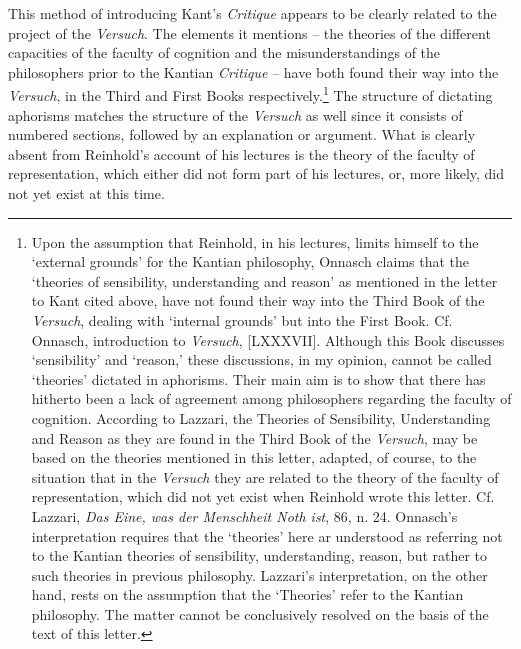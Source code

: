 This method of introducing Kant's \textit{Critique} appears to be clearly related to the project of the \textit{Versuch}. The elements it mentions {--} the theories of the different capacities of the faculty of cognition and the misunderstandings of the philosophers prior to the Kantian \textit{Critique} {--} have both found their way into the \textit{Versuch}, in the Third and First Books respectively.\footnote{ Upon the assumption that Reinhold, in his lectures, limits himself to the `external grounds' for the Kantian philosophy, Onnasch claims that the `theories of sensibility, understanding and reason' as mentioned in the letter to Kant cited above, have not found their way into the Third Book of the \textit{Versuch}, dealing with `internal grounds' but into the First Book. Cf. Onnasch, introduction to \textit{Versuch}, [LXXXVII]. Although this Book discusses `sensibility' and `reason,' these discussions, in my opinion, cannot be called `theories' dictated in aphorisms. Their main aim is to show that there has hitherto been a lack of agreement among philosophers regarding the faculty of cognition. According to Lazzari, the Theories of Sensibility, Understanding and Reason as they are found in the Third Book of the \textit{Versuch}, may be based on the theories mentioned in this letter, adapted, of course, to the situation that in the \textit{Versuch} they are related to the theory of the faculty of representation, which did not yet exist when Reinhold wrote this letter. Cf. Lazzari, \textit{Das Eine, was der Menschheit Noth ist}, 86, n. 24. Onnasch's interpretation requires that the `theories' here ar understood as referring not to the Kantian theories of sensibility, understanding, reason, but rather to such theories in previous philosophy. Lazzari's interpretation, on the other hand, rests on the assumption that the `Theories' refer to the Kantian philosophy. The matter cannot be conclusively resolved on the basis of the text of this letter. } The structure of dictating aphorisms matches the structure of the \textit{Versuch }as well since it consists of numbered sections, followed by an explanation or argument. What is clearly absent from Reinhold's account of his lectures is the theory of the faculty of representation, which either did not form part of his lectures, or, more likely, did not yet exist at this time. 

